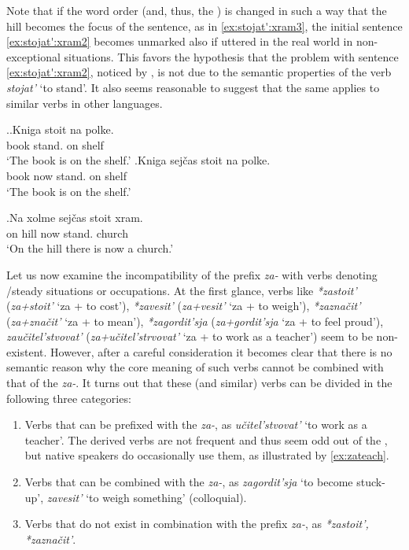 Note that if the word order (and, thus, the ) is changed in such a way that the hill becomes the focus of the sentence, as in \ref{ex:stojat':xram3}, the initial sentence \ref{ex:stojat':xram2} becomes unmarked also if uttered in the real world in non-exceptional situations. This favors the hypothesis that the problem with  sentence \ref{ex:stojat':xram2}, noticed by \citet{Paducheva:96}, is not due to the semantic properties of the verb \textit{stojat'} `to stand'. It also seems reasonable to suggest that the same applies to similar verbs in other languages. 

\ex.\label{ex:stojat':kniga}\ag.Kniga stoit na polke.\\
book stand. on shelf\\
\trans `The book is on the shelf.'
\bg.Kniga sej\v{c}as stoit na polke.\\
book now stand. on shelf\\
\trans `The book is on the shelf.'

\exg.\label{ex:stojat':xram3}Na xolme sej\v{c}as stoit xram.\\
on hill now stand. church\\
\trans `On the hill there is now a church.'

Let us now examine the incompatibility of the  prefix \textit{za-} with verbs denoting /steady situations or occupations. At the first glance, verbs like \textit{*zastoit'} (\textit{za+stoit'} `za + to cost'), \textit{*zavesit'} (\textit{za+vesit'} `za + to weigh'), \textit{*zazna\v{c}it'} (\textit{za+zna\v{c}it'} `za + to mean'), \textit{*zagordit'sja} (\textit{za+gordit'sja} `za + to feel proud'), \textit{zau\v{c}itel'stvovat'} (\textit{za+u\v{c}itel'strvovat'} `za + to work as a teacher') seem to be non-existent. However, after a careful consideration it becomes clear that there is no semantic reason why the core meaning of such verbs cannot be combined with that of the  \textit{za-}. It turns out that these (and similar) verbs can be divided in the following three categories:

\begin{enumerate}
\item Verbs that can be prefixed with the  \textit{za-}, as \textit{u\v{c}itel'stvovat'} `to work as a teacher'. The derived  verbs are not frequent and thus seem odd out of the , but native speakers do occasionally use them, as illustrated by \ref{ex:zateach}.
\item Verbs that can be combined with the  \textit{za-}, as \textit{zagordit'sja} `to become stuck-up', \textit{zavesit'} `to weigh something' (colloquial).
\item Verbs that do not exist in combination with the prefix \textit{za-}, as \textit{*zastoit', *zazna\v{c}it'}.
\end{enumerate}

